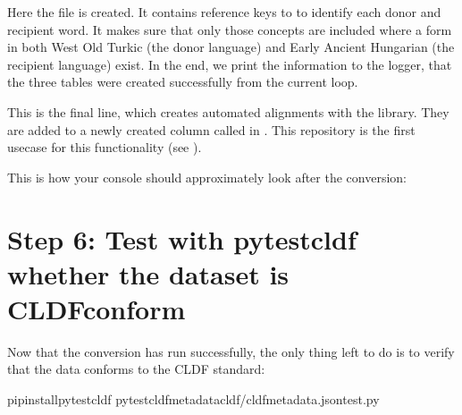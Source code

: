 \documentclass[letterpaper,10pt,english]{sphinxmanual}
\begin{document}
{{{{\begin{sphinxVerbatim}[commandchars=\\\{\}]
\end{sphinxVerbatim}

\sphinxAtStartPar
Here the file  is created. It contains reference keys
to  to identify each donor and recipient word. It makes sure
that only those concepts are included where a form in both West Old Turkic
(the donor language) and Early Ancient Hungarian (the recipient language)
exist. In the end, we print the information to the logger, that the three
tables were created successfully from the current loop.

\begin{sphinxVerbatim}[commandchars=\\\{\}]
\end{sphinxVerbatim}

\sphinxAtStartPar
This is the final line, which creates automated alignments with the
 library. They are added to a newly created
column called  in . This repository is the
first use\sphinxhyphen{}case for this functionality (see 
).

\sphinxAtStartPar
This is how your console should approximately look after the conversion:

\noindent{}


\section{Step 6: Test with pytest\sphinxhyphen{}cldf whether the dataset is CLDF\sphinxhyphen{}conform}
\label{\detokenize{mkcldf:step-6-test-with-pytest-cldf-whether-the-dataset-is-cldf-conform}}
\sphinxAtStartPar
Now that the conversion has run successfully, the only thing left to do is to
verify that the data conforms to the CLDF standard:

\begin{sphinxVerbatim}[commandchars=\\\{\}]
pipinstallpytest\PYGZhy{}cldf
pytest\PYGZhy{}\PYGZhy{}cldf\PYGZhy{}metadatacldf/cldf\PYGZhy{}metadata.jsontest.py
\end{sphinxVerbatim}

}}}}
\end{document}
